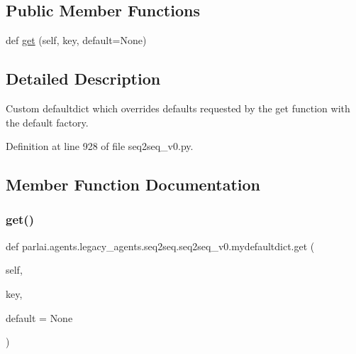 \subsection*{Public Member Functions}
\begin{DoxyCompactItemize}
\item 
def \hyperlink{classparlai_1_1agents_1_1legacy__agents_1_1seq2seq_1_1seq2seq__v0_1_1mydefaultdict_a189be974031427bf68e4691307e2f2c2}{get} (self, key, default=None)
\end{DoxyCompactItemize}


\subsection{Detailed Description}
\begin{DoxyVerb}Custom defaultdict which overrides defaults requested by the get
function with the default factory.
\end{DoxyVerb}
 

Definition at line 928 of file seq2seq\+\_\+v0.\+py.



\subsection{Member Function Documentation}
\mbox{\label{classparlai_1_1agents_1_1legacy__agents_1_1seq2seq_1_1seq2seq__v0_1_1mydefaultdict_a189be974031427bf68e4691307e2f2c2}} 
\subsubsection{\texorpdfstring{get()}{get()}}
{\footnotesize\ttfamily def parlai.\+agents.\+legacy\+\_\+agents.\+seq2seq.\+seq2seq\+\_\+v0.\+mydefaultdict.\+get (\begin{DoxyParamCaption}\item[{}]{self,  }\item[{}]{key,  }\item[{}]{default = {\ttfamily None} }\end{DoxyParamCaption})}



